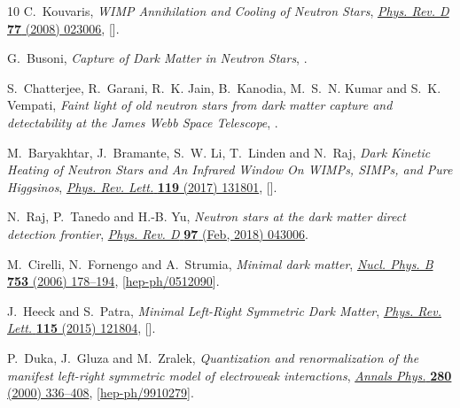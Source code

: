 \documentclass[11pt]{article}
\begin{document}
\begin{thebibliography}{10}
C.~Kouvaris, \emph{{WIMP Annihilation and Cooling of Neutron Stars}},
  \href{https://doi.org/10.1103/PhysRevD.77.023006}{\emph{Phys. Rev. D}
  {\bfseries 77} (2008) 023006},
  [\href{https://arxiv.org/abs/0708.2362}{{}}].

G.~Busoni, \emph{{Capture of Dark Matter in Neutron Stars}},
  \href{https://arxiv.org/abs/2201.00048}{{}}.

S.~Chatterjee, R.~Garani, R.~K. Jain, B.~Kanodia, M.~S.~N. Kumar and S.~K.
  Vempati, \emph{{Faint light of old neutron stars from dark matter capture and
  detectability at the James Webb Space Telescope}},
  \href{https://arxiv.org/abs/2205.05048}{{}}.

M.~Baryakhtar, J.~Bramante, S.~W. Li, T.~Linden and N.~Raj, \emph{{Dark Kinetic
  Heating of Neutron Stars and An Infrared Window On WIMPs, SIMPs, and Pure
  Higgsinos}},
  \href{https://doi.org/10.1103/PhysRevLett.119.131801}{\emph{Phys. Rev. Lett.}
  {\bfseries 119} (2017) 131801},
  [\href{https://arxiv.org/abs/1704.01577}{{}}].

N.~Raj, P.~Tanedo and H.-B. Yu, \emph{Neutron stars at the dark matter direct
  detection frontier},
  \href{https://doi.org/10.1103/PhysRevD.97.043006}{\emph{Phys. Rev. D}
  {\bfseries 97} (Feb, 2018) 043006}.

M.~Cirelli, N.~Fornengo and A.~Strumia, \emph{{Minimal dark matter}},
  \href{https://doi.org/10.1016/j.nuclphysb.2006.07.012}{\emph{Nucl. Phys. B}
  {\bfseries 753} (2006) 178--194},
  [\href{https://arxiv.org/abs/hep-ph/0512090}{{\ttfamily hep-ph/0512090}}].

J.~Heeck and S.~Patra, \emph{{Minimal Left-Right Symmetric Dark Matter}},
  \href{https://doi.org/10.1103/PhysRevLett.115.121804}{\emph{Phys. Rev. Lett.}
  {\bfseries 115} (2015) 121804},
  [\href{https://arxiv.org/abs/1507.01584}{{}}].

P.~Duka, J.~Gluza and M.~Zralek, \emph{{Quantization and renormalization of the
  manifest left-right symmetric model of electroweak interactions}},
  \href{https://doi.org/10.1006/aphy.1999.5988}{\emph{Annals Phys.} {\bfseries
  280} (2000) 336--408},
  [\href{https://arxiv.org/abs/hep-ph/9910279}{{\ttfamily hep-ph/9910279}}].


\end{thebibliography}
\end{document}
